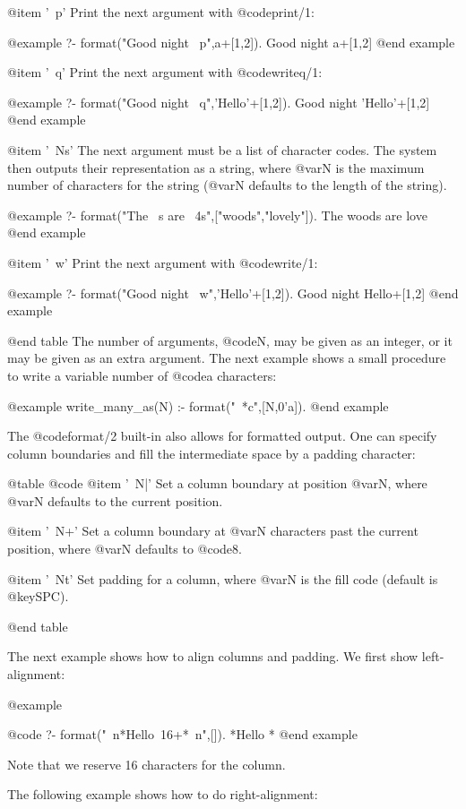 {{{{{@item '~p'
Print the next argument with @code{print/1}:

@example
?- format("Good night ~p",a+[1,2]).
Good night a+[1,2]
@end example

@item '~q'
Print the next argument with @code{writeq/1}:

@example
?- format("Good night ~q",'Hello'+[1,2]).
Good night 'Hello'+[1,2]
@end example

@item '~Ns'
The next argument must be a list of character codes. The system then
outputs their representation as a string, where @var{N} is the maximum
number of characters for the string (@var{N} defaults to the length of the
string).

@example
?- format("The ~s are ~4s",["woods","lovely"]).
The woods are love
@end example

@item '~w'
Print the next argument with @code{write/1}:

@example
?- format("Good night ~w",'Hello'+[1,2]).
Good night Hello+[1,2]
@end example

@end table
The number of arguments, @code{N}, may be given as an integer, or it
may be given as an extra argument. The next example shows a small
procedure to write a variable number of @code{a} characters:

@example
write_many_as(N) :-
        format("~*c",[N,0'a]).
@end example

The @code{format/2} built-in also allows for formatted output.  One can
specify column boundaries and fill the intermediate space by a padding
character: 

@table @code
@item '~N|'
Set a column boundary at position @var{N}, where @var{N} defaults to the
current position.

@item '~N+'
Set a column boundary at @var{N} characters past the current position, where
@var{N} defaults to @code{8}.


@item '~Nt'
Set padding for a column, where @var{N} is the fill code (default is
@key{SPC}).

@end table

The next example shows how to align columns and padding. We first show
left-alignment:

@example

@code{
   ?- format("~n*Hello~16+*~n",[]).
*Hello          *
}
@end example

Note that we reserve 16 characters for the column.

The following example shows how to do right-alignment:


}}}}}
